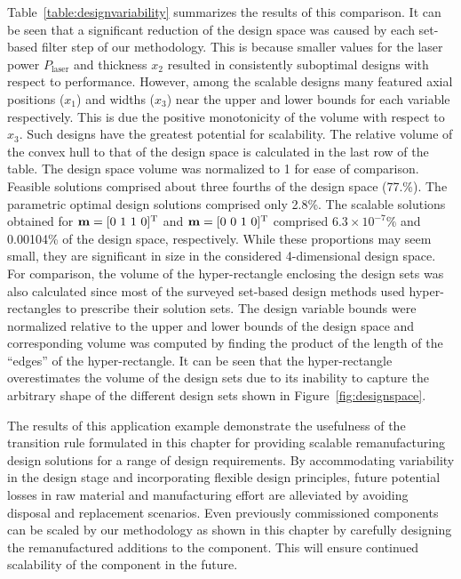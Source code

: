 Table~\ref{table:designvariability} summarizes the results of this comparison. It can be seen that a significant reduction of the design space was caused by each set-based filter step of our methodology. This is because smaller values for the laser power $P_{\textrm{laser}}$ and thickness $x_2$ resulted in consistently suboptimal designs with respect to performance. However, among the scalable designs many featured axial positions ($x_1$) and widths ($x_3$) near the upper and lower bounds for each variable respectively. This is due the positive monotonicity of the volume with respect to $x_3$. Such designs have the greatest potential for scalability. The relative volume of the convex hull to that of the design space is calculated in the last row of the table. The design space volume was normalized to 1 for ease of comparison. Feasible solutions comprised about three fourths of the design space (77.\%). The parametric optimal design solutions comprised only 2.8\%. The scalable solutions obtained for $\mathbf{m} = [0~1~1~0]^{\text T}$ and $\mathbf{m} = [0~0~1~0]^{\text T}$ comprised $6.3\times10^{-7}\%$ and 0.00104\% of the design space, respectively. While these proportions may seem small, they are significant in size in the considered 4-dimensional design space. For comparison, the volume of the hyper-rectangle enclosing the design sets was also calculated since most of the surveyed set-based design methods used hyper-rectangles to prescribe their solution sets. The design variable bounds were normalized relative to the upper and lower bounds of the design space and corresponding volume was computed by finding the product of the length of the ``edges'' of the hyper-rectangle. It can be seen that the hyper-rectangle overestimates the volume of the design sets due to its inability to capture the arbitrary shape of the different design sets shown in Figure~\ref{fig:designspace}. 

The results of this application example demonstrate the usefulness of the transition rule formulated in this chapter for providing scalable remanufacturing design solutions for a range of design requirements. By accommodating variability in the design stage and incorporating flexible design principles, future potential losses in raw material and manufacturing effort are alleviated by avoiding disposal and replacement scenarios. Even previously commissioned components can be scaled by our methodology as shown in this chapter by carefully designing the remanufactured additions to the component. This will ensure continued scalability of the component in the future.

